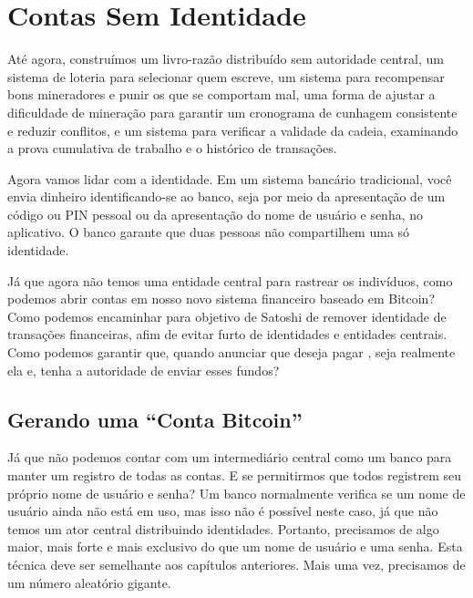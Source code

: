 \chapter{Contas Sem Identidade}
\label{ch:capitulo7}

Até agora, construímos um livro-razão distribuído sem autoridade central, um sistema de loteria para selecionar quem escreve, um sistema para recompensar bons mineradores e punir os que se comportam mal, uma forma de ajustar a dificuldade de mineração para garantir um cronograma de cunhagem consistente e reduzir conflitos, e um sistema para verificar a validade da cadeia, examinando a prova cumulativa de trabalho e o histórico de transações.

Agora vamos lidar com a identidade. 
Em um sistema bancário tradicional, você envia dinheiro identificando-se ao banco, seja por meio da apresentação de um código ou PIN pessoal ou da apresentação do nome de usuário e senha, no aplicativo. 
O banco garante que duas pessoas não compartilhem uma só identidade.

Já que agora não temos uma entidade central para rastrear os indivíduos, como podemos abrir contas em nosso novo sistema financeiro baseado em Bitcoin?
Como podemos encaminhar para objetivo de Satoshi de remover identidade de transações financeiras, afim de evitar furto de identidades e entidades centrais.%
Como podemos garantir que, quando \TraducaoNomeA anunciar que deseja pagar \TraducaoNomeB, seja realmente ela e, tenha a autoridade de enviar esses fundos?

\section*{Gerando uma “Conta Bitcoin”}

Já que não podemos contar com um intermediário central como um banco para manter um registro de todas as contas.
E se permitirmos que todos registrem seu próprio nome de usuário e senha?
Um banco normalmente verifica se um nome de usuário ainda não está em uso, mas isso não é possível neste caso, já que não temos um ator central distribuindo identidades. 
Portanto, precisamos de algo maior, mais forte e mais exclusivo do que um nome de usuário e uma senha. 
Esta técnica deve ser semelhante aos capítulos anteriores. Mais uma vez, precisamos de um número aleatório gigante.

